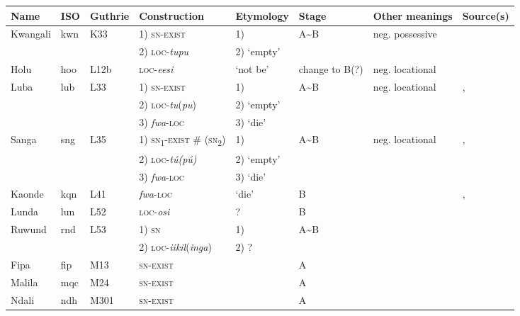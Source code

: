 \documentclass[output=paper,draft,draftmode,colorlinks,citecolor=brown]{langscibook}
\begin{document}
\begin{paperappendix}
\begin{sidewaystable}
\scriptsize
\begin{tabularx}{\textwidth}{llllllQQ}
\lsptoprule
{Name}	&{ISO}	&{Guthrie}	&{Construction}&{Etymology}		&{Stage}	&{Other meanings}&{Source(s)}\\
\midrule
{Kwangali}	&{kwn}	&{K33} 	&1) \textsc{sn-exist}&1) \textendash						&A{\textasciitilde}B&neg. possessive						&\citet{Dammann1957}\\
				&				&				&2) \textsc{loc}-\textit{tupu}						&2) `empty'\\
{Holu}		&{hoo}	&{L12b} 	&\textsc{loc}-\textit{eesi}&`not be'							&change to B(?) 	&neg. locational 									&\citet{Daeleman2003}\\
{Luba} 	&{lub}		&{L33} 	&1) \textsc{sn-exist}&1) \textendash						&A{\textasciitilde}B&neg. locational							&\citet{Beckett1951},\\
				&				&				&2) \textsc{loc}-\textit{tu}(\textit{pu})&2) `empty'			&		&												&\citet{AvermaetMbuya1954}\\
				&				&				&3) \textit{fwa}-\textsc{loc} &3) `die'\\
{Sanga} 	&{sng}	&{L35}	&1) \textsc{sn}\textsubscript{1}-\textsc{exist} \# (\textsc{sn}\textsubscript{2})&1) \textendash&A{\textasciitilde}B&neg. locational&\citet{Hadelin1938},\\
				&				&				&2) \textsc{loc}-\textit{t\'u(p\'u)}&2) `empty'				&		&												&\citet{Coupez1981}\\
				&				&				&3) \textit{fwa}-\textsc{loc}&3) `die'\\
{Kaonde} 	&{kqn}	&{L41}
&\textit{fwa}-\textsc{loc}&`die’ 							&B 		&
&\citet{Broughall1924}, \citet{Foster1960}\\
{Lunda} 	&{lun} 	&{L52}	&\textsc{loc}-\textit{osi}&? 								&B{}	&												&\citet{Kawasha2003}\\
{Ruwund} & {rnd} 	&{L53}	&1) \textsc{sn}		&1) \textendash						&A{\textasciitilde}B&										&\citet{Nash1992}\\
				&				&				&2) \textsc{loc}-\textit{iikil}(\textit{inga})& 2) ?\\
{Fipa} 	&{fip}		&{M13}	&\textsc{sn-exist}		&\textendash							&A{}	&												&\citet{Struck1911}\\
{Malila} 	&{mqc} 	&{M24} 	&\textsc{sn-exist}		&\textendash							&A{}	&												&\citet{Eaton2015b}\\
{Ndali} 	&{ndh} 	&{M301} 	&\textsc{sn-exist}		&\textendash							&A{}	&												&\citet{Botne2008}\\

\end{tabularx}
\end{sidewaystable}
\end{paperappendix}
\end{document}
